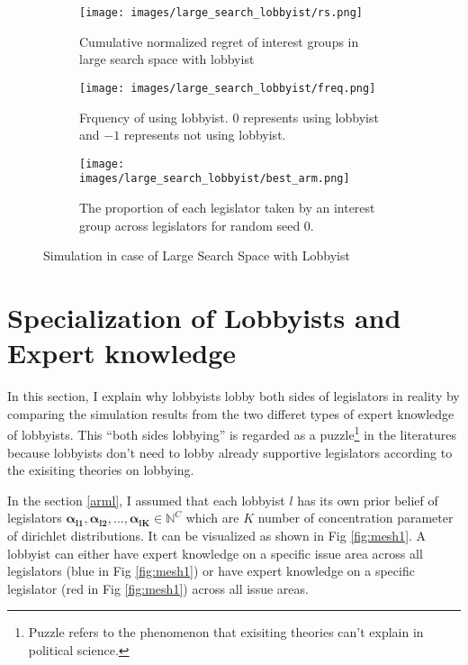 \documentclass{article}
\begin{document}
\begin{figure}[h!]
    \centering %
    \begin{subfigure}[b]{0.45\textwidth}
        
        \texttt{[image: images/large\_search\_lobbyist/rs.png]}
        
        \caption{Cumulative normalized regret of interest groups in large search space with lobbyist}
        \label{fig:rs_lb}
    \end{subfigure}
    \hfill
    \begin{subfigure}[b]{0.45\textwidth}
        \texttt{[image: images/large\_search\_lobbyist/freq.png]}
        \caption{Frquency of using lobbyist. $0$ represents using lobbyist and $-1$ represents 
        not using lobbyist.
        }
        \label{fig:lbproba}
    \end{subfigure}

    \begin{subfigure}[b]{1\columnwidth}
        \centering
        \texttt{[image: images/large\_search\_lobbyist/best\_arm.png]}
        \caption{The proportion of each legislator taken by an interest group across legislators for random seed $0$.}
        \label{fig:lbpropo}
    \end{subfigure}
    \caption{Simulation in case of Large Search Space with Lobbyist}
\end{figure}

\section{Specialization of Lobbyists and Expert knowledge}
In this section, I explain 
why lobbyists lobby both sides of legislators in reality
by comparing the simulation results from the two differet types of expert knowledge of lobbyists.
This ``both sides lobbying'' 
is regarded as a puzzle\footnote{Puzzle refers to the phenomenon that exisiting theories can't explain in political science. 
} in the literatures because lobbyists don't need to 
lobby already supportive legislators according to the exisiting theories on lobbying.


In the section \ref{arml}, I assumed 
that each lobbyist $l$ has its own prior belief of legislators $\mathbf{\alpha_{l1}}, \mathbf{\alpha_{l2}}, \hdots, \mathbf{\alpha_{lK}} \in \mathbb{N}^C$ which are $K$ number of concentration parameter of dirichlet distributions.
It can be visualized as shown in Fig \ref{fig:mesh1}. 
A lobbyist can either have expert knowledge 
on a specific issue area across all legislators (blue in Fig \ref{fig:mesh1}) or
have expert knowledge on a specific legislator (red in Fig \ref{fig:mesh1})
across all issue areas.
\end{document}
